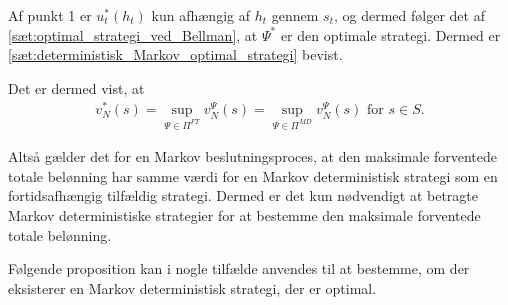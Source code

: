 \begin{bev}
Af punkt 1 er $u_t^*(h_t)$ kun afhængig af $h_t$ gennem $s_t$, og dermed følger det af \autoref{sæt:optimal_strategi_ved_Bellman}, at $\Psi^*$ er den optimale strategi.
Dermed er \autoref{sæt:deterministisk_Markov_optimal_strategi} bevist.
\end{bev}

Det er dermed vist, at
\begin{align*}
    v_N^*(s)=\sup_{\Psi\in\Pi^{FT}}v_N^\Psi(s)=\sup_{\Psi\in\Pi^{MD}}v_N^\Psi(s) \text{ for } s\in S.
\end{align*}

Altså gælder det for en Markov beslutningsproces, at den maksimale forventede totale belønning har samme værdi for en Markov deterministisk strategi som en fortidsafhængig tilfældig strategi. Dermed er det kun nødvendigt at betragte Markov deterministiske strategier for at bestemme den maksimale forventede totale belønning. 

Følgende proposition kan i nogle tilfælde anvendes til at bestemme, om der eksisterer en Markov deterministisk strategi, der er optimal. 





